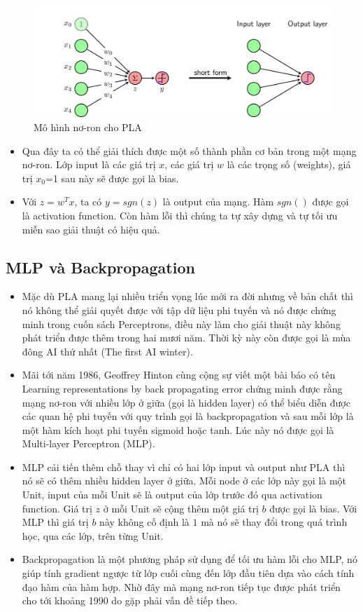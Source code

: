 \begin{figure}[ht]
\centering
        \includegraphics[totalheight=5cm]{Images/first_ann.png}
    \caption{Mô hình nơ-ron cho PLA \cite{basicdeep}}
    \label{pla}
\end{figure}

\begin{itemize}
\item Qua đây ta có thể giải thích được một số thành phần cơ bản trong một mạng nơ-ron. Lớp input là các giá trị $x$, các giá trị $w$ là các trọng số (weights), giá trị $x_{0}$=1 sau này sẽ được gọi là bias.
\item Với $z = w^{T}x$, ta có $y=sgn(z)$ là output của mạng. Hàm $sgn()$ được gọi là activation function.
Còn hàm lỗi thì chúng ta tự xây dựng và tự tối ưu miễn sao giải thuật có hiệu quả.
\end{itemize}
\subsection{MLP và Backpropagation}
\begin{itemize}
\item Mặc dù PLA mang lại nhiều triển vọng lúc mới ra đời nhưng về bản chất thì nó không thể giải quyết được với tập dữ liệu phi tuyến và nó được chứng minh trong cuốn sách Perceptrons, điều này làm cho giải thuật này không phát triển được thêm trong hai mươi năm. Thời kỳ này còn được gọi là mùa đông AI thứ nhất (The first AI winter).
\item Mãi tới năm 1986, Geoffrey Hinton cùng cộng sự viết một bài báo có tên Learning representations by back propagating error chứng minh được rằng mạng nơ-ron với nhiều lớp ở giữa (gọi là hidden layer) có thể biểu diễn được các quan hệ phi tuyến với quy trình gọi là backpropagation và sau mỗi lớp là một hàm kích hoạt phi tuyến sigmoid hoặc tanh. Lúc này nó được gọi là Multi-layer Perceptron (MLP).
\item MLP cải tiến thêm chỗ thay vì chỉ có hai lớp input và output như PLA thì nó sẽ có thêm nhiều hidden layer ở giữa. Mỗi node ở các lớp này gọi là một Unit, input của mỗi Unit sẽ là output của lớp trước đó qua activation function. Giá trị $z$ ở mỗi Unit sẽ cộng thêm một giá trị $b$ được gọi là bias. Với MLP thì giá trị $b$ này không cố định là $1$ mà nó sẽ thay đổi trong quá trình học, qua các lớp, trên từng Unit.
\item Backpropagation là một phương pháp sử dụng để tối ưu hàm lỗi cho MLP, nó giúp tính gradient ngược từ lớp cuối cùng đến lớp đầu tiên dựa vào cách tính đạo hàm của hàm hợp. Nhờ đây mà mạng nơ-ron tiếp tục được phát triển cho tới khoảng 1990 do gặp phải vấn đề tiếp theo.
\end{itemize}
